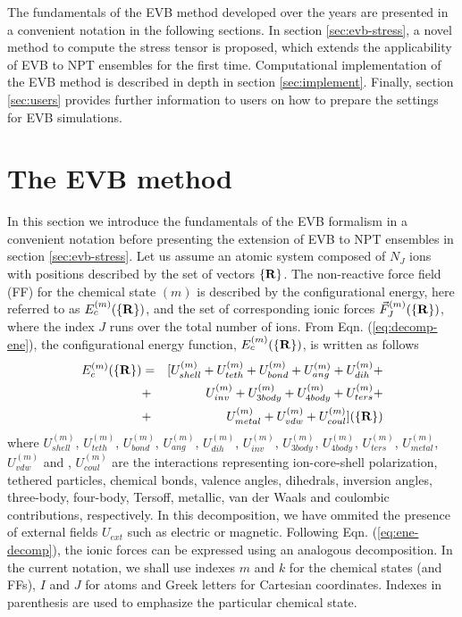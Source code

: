 The fundamentals of the EVB method developed over the years are presented in a convenient notation in the following sections. In section \ref{sec:evb-stress}, a novel method to compute the stress tensor is proposed, which extends the applicability of EVB to NPT ensembles for the first time. Computational implementation of the EVB method is described in depth in section \ref{sec:implement}. Finally, section \ref{sec:users} provides further information to users on how to prepare the settings for EVB simulations.   

\section{The EVB method}\label{sec:evb}
In this section we introduce the fundamentals of the EVB formalism in a convenient notation before presenting the extension of EVB to NPT ensembles in section \ref{sec:evb-stress}. Let us assume an atomic system composed of $N_{J}$ ions with positions described by the set  of vectors $\{\bf R\}$. The non-reactive force field (FF) for the chemical state $(m)$ is described by the configurational energy, here referred to as $E_{c}^{(m)}(\{\bf R\})$, and the set of corresponding ionic forces $\vec{F}_{J}^{(m)}(\{\bf R\})$, where the index $J$ runs over the total number of ions. From Eqn. (\ref{eq:decomp-ene}), the configurational energy function, $E_{c}^{(m)}(\{ {\bf R} \})$, is written as follows 
\begin{eqnarray}\label{eq:ene-decomp}
E_{c}^{(m)}(\{ {\bf R} \})&=& [ U^{(m)}_{shell}+U^{(m)}_{teth}+U^{(m)}_{bond}+U^{(m)}_{ang}+U^{(m)}_{dih}+ \nonumber \\
                                   &+& U^{(m)}_{inv}+U^{(m)}_{3body}+U^{(m)}_{4body}+U^{(m)}_{ters}+ \nonumber \\
                                   &+& U^{(m)}_{metal}+ U^{(m)}_{vdw}+ U^{(m)}_{coul}] (\{ {\bf R} \})
\end{eqnarray}
where $U^{(m)}_{shell}$, $U^{(m)}_{teth}$, $U^{(m)}_{bond}$, $U^{(m)}_{ang}$, $U^{(m)}_{dih}$, $U^{(m)}_{inv}$, $U^{(m)}_{3body}$, $U^{(m)}_{4body}$, $U^{(m)}_{ters}$, $U^{(m)}_{metal}$, $U^{(m)}_{vdw}$ and , $U^{(m)}_{coul}$ are the interactions representing ion-core-shell polarization, tethered particles, chemical bonds, valence angles, dihedrals, inversion angles, three-body, four-body, Tersoff, metallic, van der Waals and coulombic contributions, respectively. In this decomposition, we have ommited the presence of external fields $U_{ext}$ such as electric or magnetic. Following Eqn. (\ref{eq:ene-decomp}), the ionic forces can be expressed using an analogous decomposition. In the current notation, we shall use indexes $m$ and $k$ for the chemical states (and FFs), $I$ and $J$ for atoms and Greek letters for Cartesian coordinates. Indexes in parenthesis are used to emphasize the particular chemical state.\\
